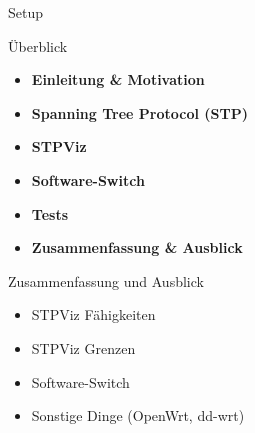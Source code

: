 \documentclass{beamer}
\begin{document}
\begin{frame}{Setup}
    \begin{figure}[h]
        \begin{center}
        \end{center}
    \end{figure}
\end{frame}

\begin{frame}{Überblick}
    \begin{itemize}
        \item \textbf{Einleitung \& Motivation}
        \item \textbf{Spanning Tree Protocol (STP)}
        \item \textbf{STPViz}
        \item \textbf{Software-Switch}
        \item \textbf{Tests}
        \item \alert{\textbf{Zusammenfassung \& Ausblick}}
    \end{itemize}
\end{frame}

\begin{frame}{Zusammenfassung und Ausblick}
    \begin{itemize}
        \item STPViz Fähigkeiten
        \item STPViz Grenzen
        \item Software-Switch
        \item Sonstige Dinge (OpenWrt, dd-wrt)
    \end{itemize}
\end{frame}
\end{document}

